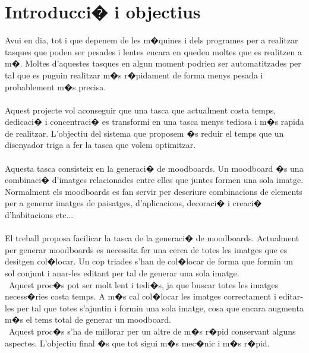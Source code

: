 \documentclass[12pt,a4paper,openright,oneside]{article}
\numberwithin{equation}{section}
\theoremstyle{definition}
\begin{document}
\tableofcontents

\newpage

\setcounter{page}{1}
\section{Introducci� i objectius}

Avui en dia, tot i que depenem de les m�quines i dels programes per a realitzar tasques que poden ser pesades i lentes encara en queden moltes que es realitzen a m�. Moltes d'aquestes tasques en algun moment podrien ser automatitzades per tal que es puguin realitzar m�s r�pidament de forma menys pesada i probablement m�s precisa.
\\\\
Aquest projecte vol aconseguir que una tasca que actualment costa temps, dedicaci� i concentraci� es transformi en una tasca menys tediosa  i m�s rapida de realitzar. L'objectiu del sistema que proposem  �s reduir el temps que un disenyador triga a fer la tasca que volem optimitzar. %
\\\\
Aquesta tasca consisteix en la generaci� de moodboards. %
Un moodboard �s una combinaci� d'imatges relacionades entre elles que juntes formen una sola imatge. Normalment  els moodboards es fan servir per descriure combinacions de elements per a generar imatges de paisatges, d'aplicacions, decoraci� i creaci� d'habitacions etc... \\\\
El treball proposa facilicar la tasca de la generaci� de moodboards. Actualment per generar moodboards es necessita fer una cerca de totes les imatges que es desitgen col�locar. Un cop triades s'han de col�locar de forma que formin un sol conjunt i anar-les editant per tal de generar una sola imatge. \\\
Aquest proc�s pot ser molt lent i tedi�s, ja que buscar totes les imatges necess�ries costa temps. A m�s cal col�locar les imatges correctament i editar-les per tal que totes s'ajuntin i formin una sola imatge, cosa que encara augmenta m�s el tems total de generar un moodboard. \\\
Aquest proc�s s'ha de millorar  per un altre de m�s r�pid conservant alguns aspectes. L'objectiu final �s que tot sigui m�s mec�nic i m�s r�pid. \\\\
\end{document}
